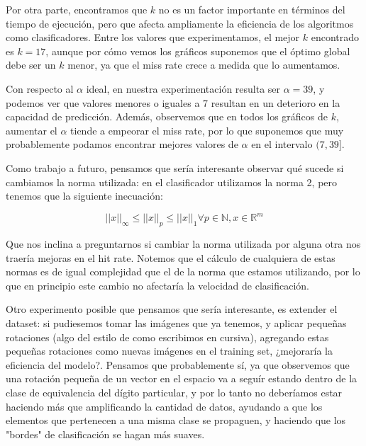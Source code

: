 \documentclass{article}
\begin{document}
Por otra parte, encontramos que $k$ no es un factor importante en términos del tiempo de ejecución, pero que afecta ampliamente la eficiencia de los algoritmos como clasificadores. Entre los valores que experimentamos, el mejor $k$ encontrado es $k = 17$, aunque por cómo vemos los gráficos suponemos que el óptimo global debe ser un $k$ menor, ya que el miss rate crece a medida que lo aumentamos.

Con respecto al $\alpha$ ideal, en nuestra experimentación resulta ser $\alpha = 39$, y podemos ver que valores menores o iguales a 7 resultan en un deterioro en la capacidad de predicción. Además, observemos que en todos los gráficos de $k$, aumentar el $\alpha$ tiende a empeorar el miss rate, por lo que suponemos que muy probablemente podamos encontrar mejores valores de $\alpha$ en el intervalo $(7, 39]$.

Como trabajo a futuro, pensamos que sería interesante observar qué sucede si cambiamos la norma utilizada: en el clasificador utilizamos la norma 2, pero tenemos que la siguiente inecuación:

$$||x||_\infty \leq ||x||_p \leq ||x||_1 \forall p \in \mathbb{N}, x \in \mathbb{R}^m$$

Que nos inclina a preguntarnos si cambiar la norma utilizada por alguna otra nos traería mejoras en el hit rate. Notemos que el cálculo de cualquiera de estas normas es de igual complejidad que el de la norma que estamos utilizando, por lo que en principio este cambio no afectaría la velocidad de clasificación.

Otro experimento posible que pensamos que sería interesante, es extender el dataset: si pudiesemos tomar las imágenes que ya tenemos, y aplicar pequeñas rotaciones (algo del estilo de como escribimos en cursiva), agregando estas pequeñas rotaciones como nuevas imágenes en el training set, ¿mejoraría la eficiencia del modelo?. Pensamos que probablemente sí, ya que observemos que una rotación pequeña de un vector en el espacio va a seguír estando dentro de la clase de equivalencia del dígito particular, y por lo tanto no deberíamos estar haciendo más que amplificando la cantidad de datos, ayudando a que los elementos que pertenecen a una misma clase se propaguen, y haciendo que los "bordes" de clasificación se hagan más suaves.

\end{document}
